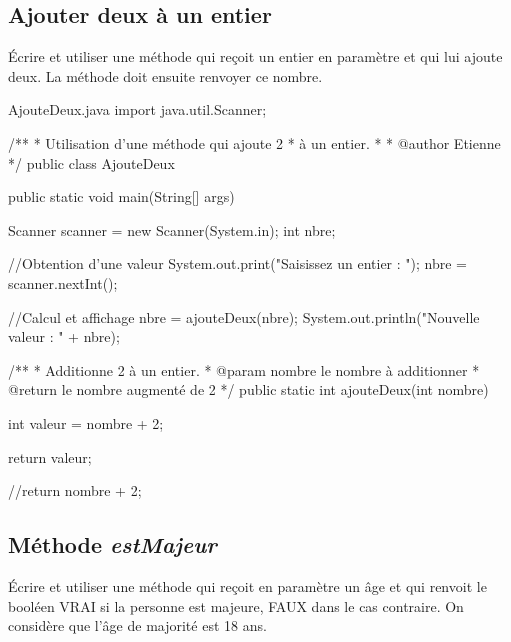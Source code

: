 \documentclass[12pt]{article}
\begin{document}
%
%
%
%
%

\subsection{Ajouter deux à un entier}

Écrire et utiliser une méthode qui reçoit un entier en paramètre et qui lui ajoute deux. La méthode doit ensuite renvoyer ce nombre.

\begin{MyTCB}{AjouteDeux.java}
import java.util.Scanner;

/**
 * Utilisation d'une méthode qui ajoute 2
 * à un entier.
 *
 * @author Etienne
 */
public class AjouteDeux {

	public static void main(String[] args) {
		
		Scanner scanner = new Scanner(System.in);
		int nbre;
		
		//Obtention d'une valeur
		System.out.print("Saisissez un entier : ");
		nbre = scanner.nextInt();
		
		//Calcul et affichage
		nbre = ajouteDeux(nbre);
		System.out.println("Nouvelle valeur : " + nbre);
		
	}
	
	
	/**
	 * Additionne 2 à un entier.
	 * @param nombre le nombre à additionner
	 * @return le nombre augmenté de 2
	 */
	public static int ajouteDeux(int nombre) {
		
		int valeur = nombre + 2;
		
		return valeur;
		
		//return nombre + 2;
	}
	
}
\end{MyTCB}

%
%
%
%
%
%

\subsection{Méthode \emph{estMajeur}}

Écrire et utiliser une méthode qui reçoit en paramètre un âge et qui renvoit le booléen VRAI si la personne est majeure, FAUX dans le cas contraire. On considère que l'âge de majorité est 18 ans.
\end{document}
